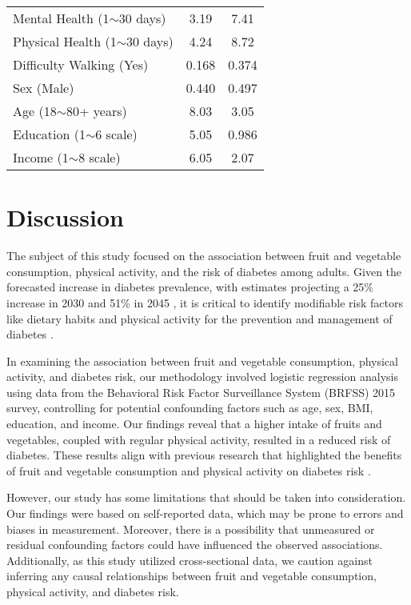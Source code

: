 \documentclass[11pt]{article}
\begin{document}
\begin{table}[!htbp]
\begin{tabular}{l c c}
Mental Health (1$\sim$30 days)   & 3.19                & 7.41                        \\
Physical Health (1$\sim$30 days) & 4.24                & 8.72                        \\
Difficulty Walking (Yes)         & 0.168               & 0.374                       \\
Sex (Male)                       & 0.440               & 0.497                       \\
Age (18$\sim$80+ years)          & 8.03                & 3.05                        \\
Education (1$\sim$6 scale)       & 5.05                & 0.986                       \\
Income (1$\sim$8 scale)          & 6.05                & 2.07                        \\
\bottomrule
\end{tabular}
\end{table}

\section*{Discussion}

The subject of this study focused on the association between fruit and vegetable consumption, physical activity, and the risk of diabetes among adults. Given the forecasted increase in diabetes prevalence, with estimates projecting a 25\% increase in 2030 and 51\% in 2045 \cite{Saeedi2019GlobalAR}, it is critical to identify modifiable risk factors like dietary habits and physical activity for the prevention and management of diabetes \cite{Uloko2018PrevalenceAR}. 

In examining the association between fruit and vegetable consumption, physical activity, and diabetes risk, our methodology involved logistic regression analysis using data from the Behavioral Risk Factor Surveillance System (BRFSS) 2015 survey, controlling for potential confounding factors such as age, sex, BMI, education, and income. Our findings reveal that a higher intake of fruits and vegetables, coupled with regular physical activity, resulted in a reduced risk of diabetes. These results align with previous research that highlighted the benefits of fruit and vegetable consumption and physical activity on diabetes risk \cite{Herbst2007ImpactOP, Carlstrm2018CoffeeCA, Drouin-Chartier2016SystematicRO}.

However, our study has some limitations that should be taken into consideration. Our findings were based on self-reported data, which may be prone to errors and biases in measurement. Moreover, there is a possibility that unmeasured or residual confounding factors could have influenced the observed associations. Additionally, as this study utilized cross-sectional data, we caution against inferring any causal relationships between fruit and vegetable consumption, physical activity, and diabetes risk. 
\end{document}
